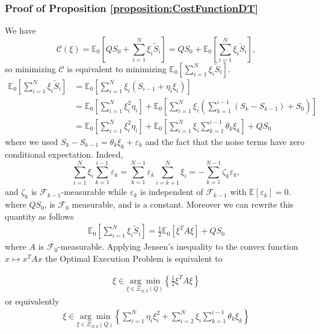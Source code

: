\documentclass[final,3p,authoryear,12pt]{elsarticle}
\begin{document}
\subsubsection{Proof of Proposition \ref{proposition:CostFunctionDT}}
We have
\[
\mathcal{C}(\xi)
= \mathbb{E}_0\left[ Q S_0 + \sum_{i=1}^N \xi_i \tilde S_i \right]
= Q S_0 + \mathbb{E}_0\left[\sum_{i=1}^N \xi_i \tilde S_i \right],
\]
so minimizing $\mathcal{C}$ is equivalent to minimizing
$\mathbb{E}_0\left[\sum_{i=1}^N \xi_i \tilde S_i\right]$.
\begin{align}
    \mathbb{E}_{0}\left[\sum_{i=1}^{N}\xi_{{i}}\tilde{S}_{{i}}\right] &= \mathbb{E}_{0}\left[\sum_{i=1}^{N}\xi_{{i}}(S_{i-1}+\eta_{{i}}\xi_{{i}})\right]\\
    &= \mathbb{E}_{0}\left[\sum_{i=1}^{N}\xi^{2}_{{i}}\eta_{{i}}\right]+\mathbb{E}_{0}\left[\sum_{i=1}^{N}\xi_{{i}}\left(\sum_{k=1}^{i-1}(S_{k}-S_{{k-1}})+S_{0}\right)\right]\\
    &=\mathbb{E}_{0}\left[\sum_{i=1}^{N}\xi^{2}_{{i}}\eta_{{i}}\right]+\mathbb{E}_{0}\left[\sum_{i=1}^{N}\xi_{{i}}\sum_{k=1}^{i-1}\theta_{k}\xi_{{k}}\right]+QS_{0}
\end{align}
where we used $S_k-S_{k-1}=\theta_k\xi_k+\varepsilon_k$ and the fact that the
noise terms have zero conditional expectation. Indeed,
\[
\sum_{i=1}^{N}\xi_{i}\sum_{k=1}^{i-1}\varepsilon_{k}
=\sum_{k=1}^{N-1}\varepsilon_{k}\sum_{i=k+1}^{N}\xi_{i}
=-\sum_{k=1}^{N-1}\zeta_{k}\varepsilon_{k},
\]
and $\zeta_k$ is $\mathcal{F}_{k-1}$-measurable while $\varepsilon_k$ is
independent of $\mathcal{F}_{k-1}$ with $\mathbb{E}[\varepsilon_k]=0$.
where $QS_{0}$, is $\mathcal{F}_{0}$ measurable, and is a constant. Moreover we can rewrite this quantity as follows 
\begin{eqnarray}
\mathbb{E}_{0}\left[\sum_{i=1}^{N}\xi_{{i}}\tilde{S}_{{i}}\right] = \frac{1}{2}\mathbb{E}_{0}\left[\xi^{T}A\xi\right]+QS_{0}
\end{eqnarray}
where $A$ is $\mathcal{F}_{0}$-measurable. Applying Jensen’s inequality to the convex function $x\mapsto x^{T}Ax$ the Optimal Execution Problem is equivalent to 

\begin{eqnarray}
    \xi \in \underset{\xi \in \Xi_{N,0}(Q)}{\arg \min} \left\{ \frac{1}{2}\xi^{T}A\xi\right\}
\end{eqnarray}
or equivalently
\begin{align}
    \label{problem:AC_ConstantImpacts}
    \xi \in \underset{\xi \in \Xi_{N,0}(Q)}{\arg \min} \left\{ \sum_{i=1}^{N}\eta_{{i}} \xi_{i}^{2}+\sum_{i=2}^{N}\xi_{i}\sum_{k=1}^{i-1}\theta_{{k}}\xi_{k}\right\}
    \end{align}
\end{document}

